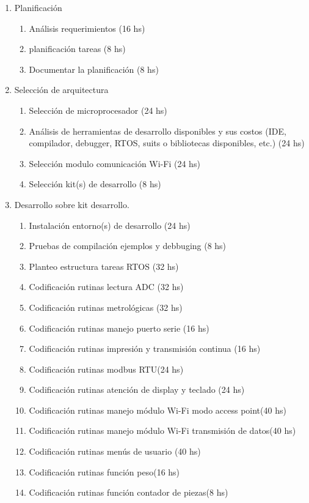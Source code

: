 \documentclass[11pt]{charter}
\begin{document}
\begin{enumerate}
\item Planificación
	\begin{enumerate}
	\item Análisis requerimientos (16 hs)
	\item planificación tareas (8 hs)
	\item Documentar la planificación (8 hs)
	\end{enumerate}
\item Selección de arquitectura
	\begin{enumerate}
	\item Selección de microprocesador (24 hs)
	\item Análisis de herramientas de desarrollo disponibles y sus costos (IDE, compilador, debugger, RTOS, suits o bibliotecas disponibles, etc.) (24 hs)
	\item Selección modulo comunicación Wi-Fi (24 hs)
	\item Selección kit(s) de desarrollo (8 hs)
	\end{enumerate}
\item Desarrollo sobre kit desarrollo.
	\begin{enumerate}
	\item Instalación entorno(s) de desarrollo (24 hs)
	\item Pruebas de compilación ejemplos y debbuging (8 hs)
	\item Planteo estructura tareas RTOS	(32 hs)
	\item Codificación rutinas lectura ADC (32 hs)
	\item Codificación rutinas metrológicas (32 hs)
	\item Codificación rutinas manejo puerto serie (16 hs)
	\item Codificación rutinas impresión y transmisión continua (16 hs)
	\item Codificación rutinas modbus RTU(24 hs)
	\item Codificación rutinas atención de display y teclado (24 hs)
	\item Codificación rutinas manejo módulo Wi-Fi modo access point(40 hs)
	\item Codificación rutinas manejo módulo Wi-Fi transmisión de datos(40 hs)
	\item Codificación rutinas menús de usuario (40 hs)
	\item Codificación rutinas función peso(16 hs)
	\item Codificación rutinas función contador de piezas(8 hs)

\end{enumerate}
\end{enumerate}
\end{document}
